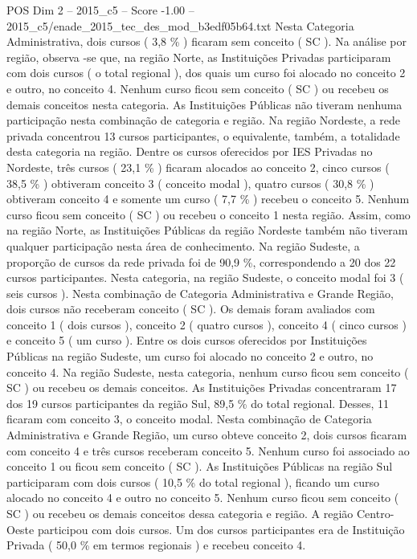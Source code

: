 \begin{textsample}{POS Dim 2 – 2015\_c5 – Score -1.00 – 2015\_c5/enade\_2015\_tec\_des\_mod\_b3edf05b64.txt}
Nesta Categoria Administrativa, dois cursos ( 3,8 \% ) ficaram sem conceito ( SC ).
Na análise por região, observa -se que, na região Norte, as Instituições Privadas participaram com dois cursos ( o total regional ), dos quais um curso foi alocado no conceito 2 e outro, no conceito 4.
Nenhum curso ficou sem conceito ( SC ) ou recebeu os demais conceitos nesta categoria.
As Instituições Públicas não tiveram nenhuma participação nesta combinação de categoria e região.
Na região Nordeste, a rede privada concentrou 13 cursos participantes, o equivalente, também, a totalidade desta categoria na região.
Dentre os cursos oferecidos por IES Privadas no Nordeste, três cursos ( 23,1 \% ) ficaram alocados ao conceito 2, cinco cursos ( 38,5 \% ) obtiveram conceito 3 ( conceito modal ), quatro cursos ( 30,8 \% ) obtiveram conceito 4 e somente um curso ( 7,7 \% ) recebeu o conceito 5.
Nenhum curso ficou sem conceito ( SC ) ou recebeu o conceito 1 nesta região.
Assim, como na região Norte, as Instituições Públicas da região Nordeste também não tiveram qualquer participação nesta área de conhecimento.
Na região Sudeste, a proporção de cursos da rede privada foi de 90,9 \%, correspondendo a 20 dos 22 cursos participantes.
Nesta categoria, na região Sudeste, o conceito modal foi 3 ( seis cursos ).
Nesta combinação de Categoria Administrativa e Grande Região, dois cursos não receberam conceito ( SC ).
Os demais foram avaliados com conceito 1 ( dois cursos ), conceito 2 ( quatro cursos ), conceito 4 ( cinco cursos ) e conceito 5 ( um curso ).
Entre os dois cursos oferecidos por Instituições Públicas na região Sudeste, um curso foi alocado no conceito 2 e outro, no conceito 4.
Na região Sudeste, nesta categoria, nenhum curso ficou sem conceito ( SC ) ou recebeu os demais conceitos.
As Instituições Privadas concentraram 17 dos 19 cursos participantes da região Sul, 89,5 \% do total regional.
Desses, 11 ficaram com conceito 3, o conceito modal.
Nesta combinação de Categoria Administrativa e Grande Região, um curso obteve conceito 2, dois cursos ficaram com conceito 4 e três cursos receberam conceito 5.
Nenhum curso foi associado ao conceito 1 ou ficou sem conceito ( SC ).
As Instituições Públicas na região Sul participaram com dois cursos ( 10,5 \% do total regional ), ficando um curso alocado no conceito 4 e outro no conceito 5.
Nenhum curso ficou sem conceito ( SC ) ou recebeu os demais conceitos dessa categoria e região.
A região Centro-Oeste participou com dois cursos.
Um dos cursos participantes era de Instituição Privada ( 50,0 \% em termos regionais ) e recebeu conceito 4.

\end{textsample}
